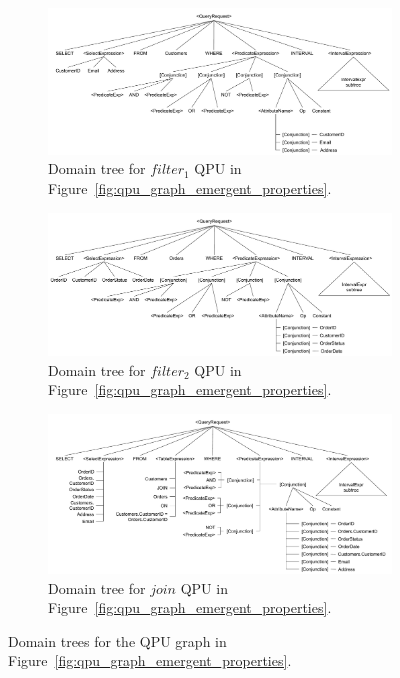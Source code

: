 \begin{figure}[H]
        \centering
        \begin{subfigure}[b]{0.48\textwidth}
            \centering
            \includegraphics[width=\textwidth]{./figures/design_pattern/qpt_filter_customers.pdf}
            \caption{Domain tree for $filter_1$ QPU in Figure~\ref{fig:qpu_graph_emergent_properties}.}
            \label{fig:qpt_filter_customers}
        \end{subfigure}
        \hfill
        \begin{subfigure}[b]{0.48\textwidth}
            \centering
            \includegraphics[width=\textwidth]{./figures/design_pattern/qpt_filter_orders.pdf}
  \caption{Domain tree for $filter_2$ QPU in Figure~\ref{fig:qpu_graph_emergent_properties}.}
  \label{fig:qpt_filter_orders}
        \end{subfigure}
        \hfill
        \begin{subfigure}[b]{\textwidth}
            \centering
            \includegraphics[width=\textwidth]{./figures/design_pattern/qpt_join.pdf}
            \caption{Domain tree for $join$ QPU in Figure~\ref{fig:qpu_graph_emergent_properties}.}
            \label{fig:qpt_join}
        \end{subfigure}
        \caption{Domain trees for the QPU graph in Figure~\ref{fig:qpu_graph_emergent_properties}.}
    \end{figure}

